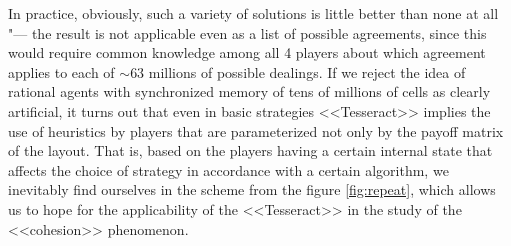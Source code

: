 In practice, obviously, such a variety of solutions is little better than none at all "--- the result is not applicable even as a list of possible agreements, since this would require common knowledge among all 4 players about which agreement applies to each of $\sim 63$ millions of possible dealings. If we reject the idea of ​​rational agents with synchronized memory of tens of millions of cells as clearly artificial, it turns out that even in basic strategies <<Tesseract>> implies the use of heuristics by players that are parameterized not only by the payoff matrix of the layout. That is, based on the players having a certain internal state that affects the choice of strategy in accordance with a certain algorithm, we inevitably find ourselves in the scheme from the figure \ref{fig:repeat}, which allows us to hope for the applicability of the <<Tesseract>> in the study of the <<cohesion>> phenomenon. %


